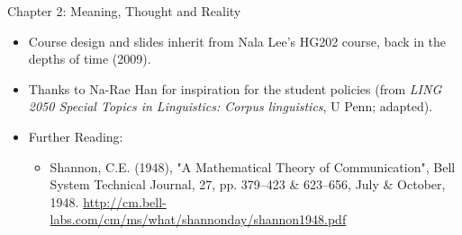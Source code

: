 \documentclass[headrule,footrule]{foils}
\begin{document}
 Chapter 2: Meaning, Thought and Reality

\begin{itemize}
\item Course design and slides inherit from Nala Lee's HG202 course,
  back in the depths of time (2009).
\item Thanks to Na-Rae Han for 
  inspiration for the student policies (from  \textit{LING 2050 Special Topics in Linguistics: Corpus linguistics}, U Penn; adapted).
  \item Further Reading: 
  \begin{itemize}
  \item  Shannon, C.E. (1948), "A Mathematical Theory of Communication", Bell System Technical Journal, 27, pp. 379–423 \& 623–656, July \& October, 1948. \url{http://cm.bell-labs.com/cm/ms/what/shannonday/shannon1948.pdf}
  \end{itemize}
\end{itemize}

\renewcommand{\section}[2]{}
\renewcommand{\baselinestretch}{0.9}


\end{document}
